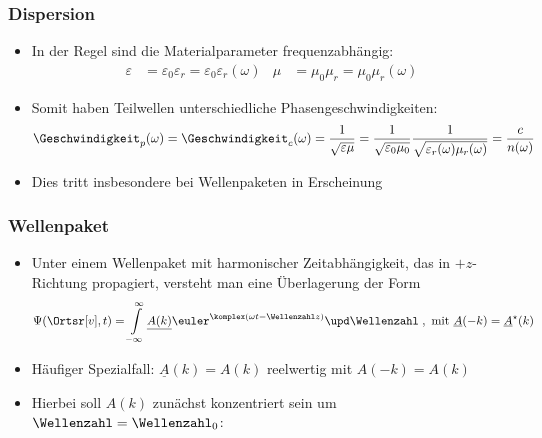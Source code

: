 \begin{frame}
  \frametitle{Dispersion}
  \begin{itemize}[<+->]
  \item In der Regel sind die Materialparameter \alert{frequenzabhängig}:
    \begin{align*}
      \varepsilon &= \varepsilon_0\varepsilon_r = \varepsilon_0\varepsilon_r(\omega) & \mu &= \mu_0\mu_r = \mu_0\mu_r(\omega)  
    \end{align*}
  \item Somit haben \alert{Teilwellen unterschiedliche Phasengeschwindigkeiten}:
    \begin{equation*}
      \Geschwindigkeit_p (\omega) = \Geschwindigkeit_c(\omega) = \frac{1}{\sqrt{\varepsilon\mu}} = \frac{1}{\sqrt{\varepsilon_0\mu_0}} \frac{1}{\sqrt{\varepsilon_r(\omega)\mu_r(\omega)}}=\frac{c}{n(\omega)} 
    \end{equation*}
  \item Dies tritt insbesondere bei \alert{Wellenpaketen} in Erscheinung
  \end{itemize}
  \end{frame}

  
\begin{frame}
  \frametitle{Wellenpaket}
      \begin{itemize}[<+->]
    \item Unter einem Wellenpaket mit \alert{harmonischer Zeitabhängigkeit}, das in \alert{\(+z\)-Richtung} propagiert, versteht man eine Überlagerung der Form
    \begin{equation*}
      \Psi (\Ortsr[v], t) = \int\limits_{-\infty}^\infty \underline{A(k)} \euler^{\komplex (\omega t - \Wellenzahl z)} \upd \Wellenzahl\; , \text{ mit } \underline{A}(-k) = \underline{A}^\star(k)
    \end{equation*}
    \item Häufiger Spezialfall: $\underline{A}(k) = A(k)$ reelwertig mit $A(-k) = A(k)$
  \item Hierbei soll \(A(k)\) zunächst \alert{konzentriert} sein um \(\Wellenzahl = \Wellenzahl_0\): 

    \end{itemize}
  \end{frame}



